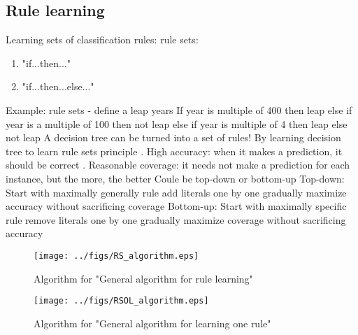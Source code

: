 \subsection{Rule learning}
Learning sets of classification rules: rule sets:
\begin{enumerate}
    \item "if...then..."
    \item "if...then...else..."
\end{enumerate}
\begin{outline}
    \1 Example: rule sets - define a leap years
        \2 If year is multiple of 400 then leap
        \2 else if year is a multiple of 100 then not leap
        \2 else if year is multiple of 4 then leap
        \2 else not leap
    \1 A decision tree can be turned into a set of rules!
        \2 By learning decision tree to learn rule sets
    \1 principle
        . High accuracy: when it makes a prediction, it should be correct
        . Reasonable coverage: it needs not make a prediction for each instance, but the more, the better
    \1 Coule be top-down or bottom-up
        \2 Top-down:
            \3 Start with maximally generally rule
            \3 add literals one by one
            \3 gradually maximize accuracy without sacrificing coverage
        \2 Bottom-up:
            \3 Start with maximally specific rule
            \3 remove literals one by one
            \3 gradually maximize coverage without sacrificing accuracy
\end{outline}
\begin{figure}[htbp]
    \centering
    \texttt{[image: ../figs/RS\_algorithm.eps]}
    \caption{Algorithm for "General algorithm for rule learning"}
    \label{fig:rulesets_algorithm}
\end{figure}

\begin{figure}[htbp]
    \centering
    \texttt{[image: ../figs/RSOL\_algorithm.eps]}
    \caption{Algorithm for "General algorithm for learning one rule"}
    \label{fig:learnonerule_algorithm}
\end{figure}

